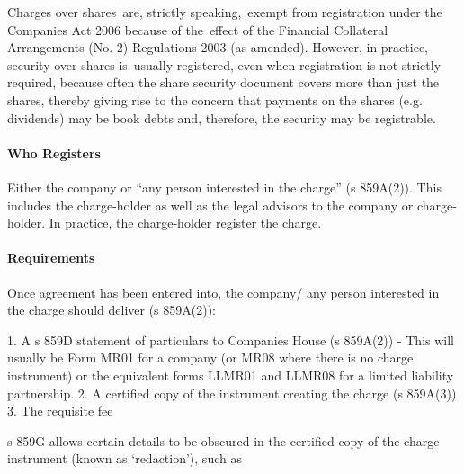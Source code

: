 \documentclass[
]{article}
\newenvironment{Shaded}{}{}
\newcommand{\NormalTok}[1]{#1}
\begin{document}
\begin{Shaded}
\begin{Highlighting}[]
\NormalTok{Charges over shares are, strictly speaking, exempt from registration under the Companies Act 2006 because of the effect of the Financial Collateral Arrangements (No. 2) Regulations 2003 (as amended). However, in practice, security over shares is usually registered, even when registration is not strictly required, because often the share security document covers more than just the shares, thereby giving rise to the concern that payments on the shares (e.g. dividends) may be book debts and, therefore, the security may be registrable.}
\end{Highlighting}
\end{Shaded}

\hypertarget{who-registers}{%
\paragraph{Who Registers}\label{who-registers}}

Either the company or ``any person interested in the charge'' (s
859A(2)). This includes the charge-holder as well as the legal advisors
to the company or charge-holder. In practice, the charge-holder register
the charge.

\hypertarget{requirements}{%
\paragraph{Requirements}\label{requirements}}

\begin{Shaded}
\begin{Highlighting}[]
\NormalTok{Once agreement has been entered into, the company/ any person interested in the charge should deliver (s 859A(2)):}

\NormalTok{1. A s 859D statement of particulars to Companies House (s 859A(2))}
\NormalTok{    {-} This will usually be Form MR01 for a company (or MR08 where there is no charge instrument) or the equivalent forms LLMR01 and LLMR08 for a limited liability partnership.}
\NormalTok{2. A certified copy of the instrument creating the charge (s 859A(3))}
\NormalTok{3. The requisite fee}
\end{Highlighting}
\end{Shaded}

s 859G allows certain details to be obscured in the certified copy of
the charge instrument (known as `redaction'), such as
\end{document}
